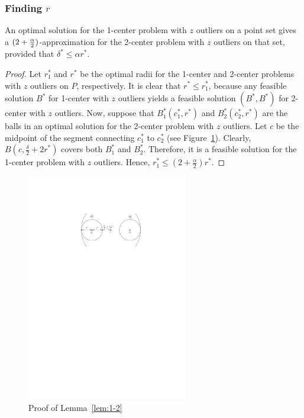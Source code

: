 \documentclass[envcountsame]{cls/cccg15}
\newcommand{\lee}{\leqslant}
\renewcommand{\le}{\lee}
\begin{document}
\subsubsection{Finding $r$}
\label{subsec:findr}


\begin{lemma}
\label{lem:1-2}
	An optimal solution for the 1-center problem with $z$ outliers on a point set
	gives a $(2 + {\alpha \over 2})$-approximation for
	the 2-center problem with $z$ outliers on that set,
	provided that $\delta^* \le \alpha r^*$.
\end{lemma}



\begin{proof}
Let $r_1^*$ and $r^*$ be the optimal radii for
the 1-center and 2-center problems with $z$ outliers on $P$, respectively.
It is clear that $r^* \le r_1^*$,
because any feasible solution $B^*$ for 1-center with $z$ outliers
yields a feasible solution $(B^*, B^*)$ for 2-center with $z$ outliers.
Now, suppose that $B_1^*(c_1^*, r^*)$ and $B_2^*(c_2^*, r^*)$
are the balls in an optimal solution for the 2-center problem with $z$ outliers.
Let $c$ be the midpoint of the segment connecting 
$c_1^*$ to $c_2^*$ (see Figure~\ref{fig:2lt1}).
Clearly, $B\left(c, \frac{\delta}{2} + 2r^*\right)$ covers both $B_1^*$ and $B_2^*$. 
Therefore, it is a feasible solution for the 1-center problem with $z$ outliers.
Hence, $ r_1^* \le \left(2 + \frac{\alpha}{2}\right) r^*$.
\end{proof}

\begin{figure}[th]
	\centering
	\includegraphics[width=19em]{figs/2lt1}
	\caption{Proof of Lemma~\ref{lem:1-2}}
	\label{fig:2lt1}
\end{figure}
\end{document}
